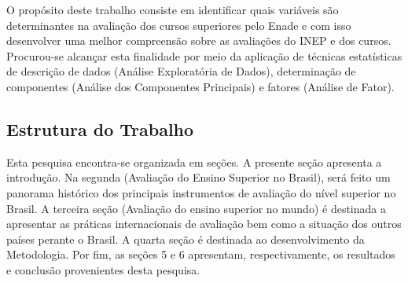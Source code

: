 O propósito deste trabalho consiste em identificar quais variáveis são determinantes na avaliação dos cursos superiores pelo Enade e com isso desenvolver uma melhor compreensão sobre as avaliações do INEP e dos cursos. Procurou-se alcançar esta finalidade por meio da aplicação de técnicas estatísticas de descrição de dados (Análise Exploratória de Dados), determinação de componentes (Análise dos Componentes Principais) e fatores
(Análise de Fator).

\subsection{Estrutura do Trabalho}

Esta pesquisa encontra-se organizada em seções. A presente seção apresenta a introdução. Na segunda (Avaliação do Ensino Superior no Brasil), será feito um panorama histórico dos principais instrumentos de avaliação do nível superior no Brasil. A terceira seção (Avaliação do ensino superior no mundo) é destinada a apresentar as práticas internacionais de avaliação bem como a situação dos outros países perante o Brasil. A quarta seção é destinada ao desenvolvimento da Metodologia. Por fim, as seções 5 e 6 apresentam, respectivamente, os resultados e conclusão provenientes desta pesquisa.

\pagebreak